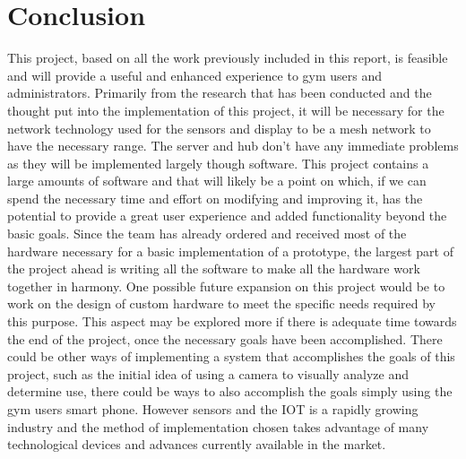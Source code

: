 \documentclass[ppfs.tex]{template/subfiles}
\begin{document}
\section{Conclusion}
This project, based on all the work previously included in this report, is feasible and will provide a useful and enhanced experience to gym users and administrators. Primarily from the research that has been conducted and the thought put into the implementation of this project, it will be necessary for the network technology used for the sensors and display to be a mesh network to have the necessary range. The server and hub don't have any immediate problems as they will be implemented largely though software. This project contains a large amounts of software and that will likely be a point on which, if we can spend the necessary time and effort on modifying and improving it, has the potential to provide a great user experience and added functionality beyond the basic goals. Since the team has already ordered and received most of the hardware necessary for a basic implementation of a prototype, the largest part of the project ahead is writing all the software to make all the hardware work together in harmony. One possible future expansion on this project would be to work on the design of custom hardware to meet the specific needs required by this purpose. This aspect may be explored more if there is adequate time towards the end of the project, once the necessary goals have been accomplished. There could be other ways of implementing a system that accomplishes the goals of this project, such as the initial idea of using a camera to visually analyze and determine use, there could be ways to also accomplish the goals simply using the gym users smart phone. However sensors and the IOT is a rapidly growing industry and the method of implementation chosen takes advantage of many technological devices and advances currently available in the market. 
\end{document}
